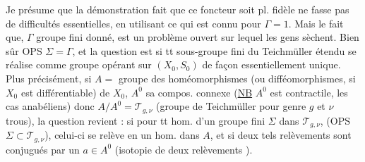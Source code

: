  Je présume que la démonstration
 fait que ce foncteur soit pl. fidèle
ne fasse pas de difficultés essentielles,
en utilisant ce qui est connu pour
\(\Gamma=1\). Mais le fait que,  \(\Gamma\) groupe
fini donné, 
est un problème ouvert sur lequel les
gens sèchent. Bien sûr OPS \(\Sigma=\Gamma\),
et la question est si tt sous-groupe
fini du Teichmüller étendu se
réalise comme groupe opérant sur \((X_0,S_0)\) 
de façon essentiellement unique. Plus
précisément, si  \(A=\) groupe des homéomorphismes
(ou difféomorphismes, si \(X_0\) est
différentiable) de \(X_0\), \(A^0\) sa compos. 
connexe (\uline{NB} \(A^0\) est contractile, \deleted{\unsure{)}}
les cas anabéliens) donc \(A/A^0=\mathcal T_{g,\nu}\)
(groupe de Teichmüller pour genre \(g\) et \(\nu\)
trous), la question revient :  si pour tt
hom. d'un groupe fini \(\Sigma\) dans  \(\mathcal T_{g,\nu}\),
(OPS \(\Sigma\subset\mathcal T_{g,\nu}\)), celui-ci se relève
en un hom. dans \(A\), et si deux tels
relèvements sont conjugués par un \(a\in A^0\)
(isotopie  de deux relèvements \unsure{\(\sim\)}).

